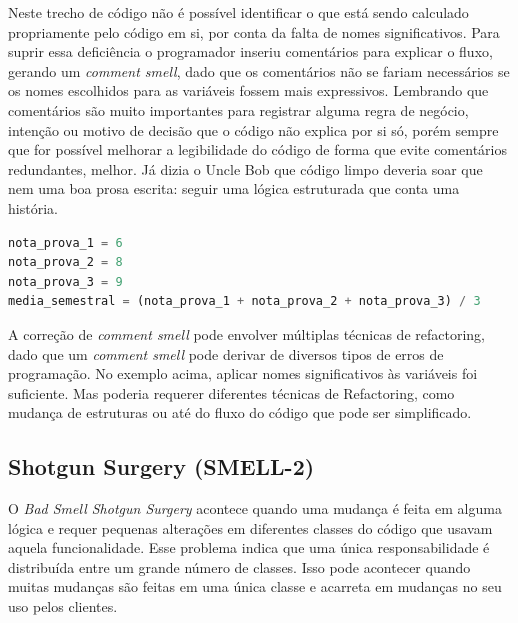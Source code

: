 \documentclass[12pt,a4paper]{article}
\newcommand{\smell}[1]{\textit{#1}}
\begin{document}
Neste trecho de código não é possível identificar o que está sendo calculado propriamente pelo código em si, por conta da falta de nomes significativos. Para suprir essa deficiência o programador inseriu comentários para explicar o fluxo, gerando um \smell{comment smell}, dado que os comentários não se fariam necessários se os nomes escolhidos para as variáveis fossem mais expressivos. Lembrando que comentários são muito importantes para registrar alguma regra de negócio, intenção ou motivo de decisão que o código não explica por si só, porém sempre que for possível melhorar a legibilidade do código de forma que evite comentários redundantes, melhor. Já dizia o Uncle Bob que código limpo deveria soar que nem uma boa prosa escrita: seguir uma lógica estruturada que conta uma história.

\begin{lstlisting}[language=Python,caption={Nomes que tornam o comentário desnecessário},label={lst:comments-after}]
nota_prova_1 = 6
nota_prova_2 = 8
nota_prova_3 = 9
media_semestral = (nota_prova_1 + nota_prova_2 + nota_prova_3) / 3
\end{lstlisting}


A correção de \smell{comment smell} pode envolver múltiplas técnicas de refactoring, dado que um \smell{comment smell} pode derivar de diversos tipos de erros de programação. No exemplo acima, aplicar nomes significativos às variáveis foi suficiente. Mas poderia requerer diferentes técnicas de Refactoring, como mudança de estruturas ou até do fluxo do código que pode ser simplificado.

\subsection{Shotgun Surgery (SMELL-2)}

O \smell{Bad Smell Shotgun Surgery} acontece quando uma mudança é feita em alguma lógica e requer pequenas alterações em diferentes classes do código que usavam aquela funcionalidade. Esse problema indica que uma única responsabilidade é distribuída entre um grande número de classes. Isso pode acontecer quando muitas mudanças são feitas em uma única classe e acarreta em mudanças no seu uso pelos clientes.
\end{document}
